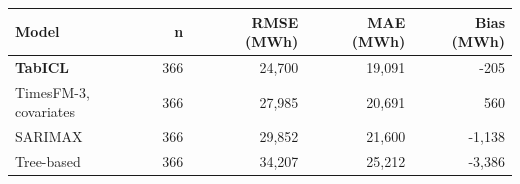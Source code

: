 \begin{tabular}{lrrrr}
\toprule
Model & n & RMSE (MWh) & MAE (MWh) & Bias (MWh) \\
\midrule
\textbf{TabICL} & 366 & 24,700 & 19,091 & -205 \\
TimesFM-3, covariates & 366 & 27,985 & 20,691 & 560 \\
SARIMAX & 366 & 29,852 & 21,600 & -1,138 \\
Tree-based & 366 & 34,207 & 25,212 & -3,386 \\
\bottomrule
\end{tabular}
